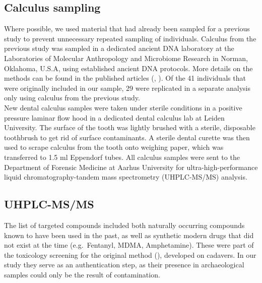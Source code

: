 \documentclass[
  b5paper,
]{book}
\begin{document}
\subsection{Calculus sampling}\label{calculus-sampling}

Where possible, we used material that had already been sampled for a
previous study to prevent unnecessary repeated sampling of individuals.
Calculus from the previous study was sampled in a dedicated ancient DNA
laboratory at the Laboratories of Molecular Anthropology and Microbiome
Research in Norman, Oklahoma, U.S.A, using established ancient DNA
protocols. More details on the methods can be found in the published
articles (, ). Of the 41
individuals that were originally included in our sample, 29 were
replicated in a separate analysis only using calculus from the previous
study.\\
New dental calculus samples were taken under sterile conditions in a
positive pressure laminar flow hood in a dedicated dental calculus lab
at Leiden University. The surface of the tooth was lightly brushed with
a sterile, disposable toothbrush to get rid of surface contaminants. A
sterile dental curette was then used to scrape calculus from the tooth
onto weighing paper, which was transferred to 1.5 ml Eppendorf tubes.
All calculus samples were sent to the Department of Forensic Medicine at
Aarhus University for ultra-high-performance liquid
chromatography-tandem mass spectrometry (UHPLC-MS/MS) analysis.

\subsection{UHPLC-MS/MS}\label{uhplc-msms}

The list of targeted compounds included both naturally occurring
compounds known to have been used in the past, as well as synthetic
modern drugs that did not exist at the time (e.g.~Fentanyl, MDMA,
Amphetamine). These were part of the toxicology screening for the
original method (), developed on cadavers. In our study they serve as an
authentication step, as their presence in archaeological samples could
only be the result of contamination.
\end{document}
